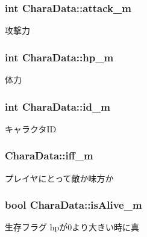 \subsubsection[{attack\+\_\+m}]{\setlength{\rightskip}{0pt plus 5cm}int Chara\+Data\+::attack\+\_\+m}\label{struct_chara_data_a329e47c82a4348e2245713aeb51eced5}
攻撃力 \hypertarget{struct_chara_data_a7186ee61c28b6a84b0c7a41524ee7d01}{}
\subsubsection[{hp\+\_\+m}]{\setlength{\rightskip}{0pt plus 5cm}int Chara\+Data\+::hp\+\_\+m}\label{struct_chara_data_a7186ee61c28b6a84b0c7a41524ee7d01}
体力 \hypertarget{struct_chara_data_a6254be2e5f02a77d30c48c0be2438609}{}
\subsubsection[{id\+\_\+m}]{\setlength{\rightskip}{0pt plus 5cm}int Chara\+Data\+::id\+\_\+m}\label{struct_chara_data_a6254be2e5f02a77d30c48c0be2438609}
キャラクタ\+I\+D \hypertarget{struct_chara_data_af593fbc602f98606ea757a0100f28083}{}
\subsubsection[{iff\+\_\+m}]{ Chara\+Data\+::iff\+\_\+m}\label{struct_chara_data_af593fbc602f98606ea757a0100f28083}
プレイヤにとって敵か味方か \hypertarget{struct_chara_data_a87b4617204eaa6cb9a683389afb0647e}{}
\subsubsection[{is\+Alive\+\_\+m}]{\setlength{\rightskip}{0pt plus 5cm}bool Chara\+Data\+::is\+Alive\+\_\+m}\label{struct_chara_data_a87b4617204eaa6cb9a683389afb0647e}
生存フラグ hpが0より大きい時に真 \hypertarget{struct_chara_data_ad76e5c9e2a90755979af927101ec43ac}{}
